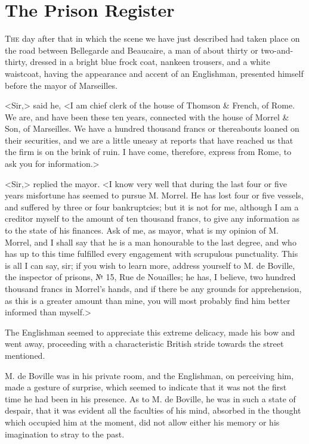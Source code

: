 \chapter{The Prison Register} 

 \lettrine{T}{he} day after that in which the scene we have just described had taken place on the road between Bellegarde and Beaucaire, a man of about thirty or two-and-thirty, dressed in a bright blue frock coat, nankeen trousers, and a white waistcoat, having the appearance and accent of an Englishman, presented himself before the mayor of Marseilles. 

 <Sir,> said he, <I am chief clerk of the house of Thomson \& French, of Rome. We are, and have been these ten years, connected with the house of Morrel \& Son, of Marseilles. We have a hundred thousand francs or thereabouts loaned on their securities, and we are a little uneasy at reports that have reached us that the firm is on the brink of ruin. I have come, therefore, express from Rome, to ask you for information.> 

 <Sir,> replied the mayor. <I know very well that during the last four or five years misfortune has seemed to pursue M. Morrel. He has lost four or five vessels, and suffered by three or four bankruptcies; but it is not for me, although I am a creditor myself to the amount of ten thousand francs, to give any information as to the state of his finances. Ask of me, as mayor, what is my opinion of M. Morrel, and I shall say that he is a man honourable to the last degree, and who has up to this time fulfilled every engagement with scrupulous punctuality. This is all I can say, sir; if you wish to learn more, address yourself to M. de Boville, the inspector of prisons, № 15, Rue de Nouailles; he has, I believe, two hundred thousand francs in Morrel's hands, and if there be any grounds for apprehension, as this is a greater amount than mine, you will most probably find him better informed than myself.> 

 The Englishman seemed to appreciate this extreme delicacy, made his bow and went away, proceeding with a characteristic British stride towards the street mentioned. 

 M. de Boville was in his private room, and the Englishman, on perceiving him, made a gesture of surprise, which seemed to indicate that it was not the first time he had been in his presence. As to M. de Boville, he was in such a state of despair, that it was evident all the faculties of his mind, absorbed in the thought which occupied him at the moment, did not allow either his memory or his imagination to stray to the past. 

